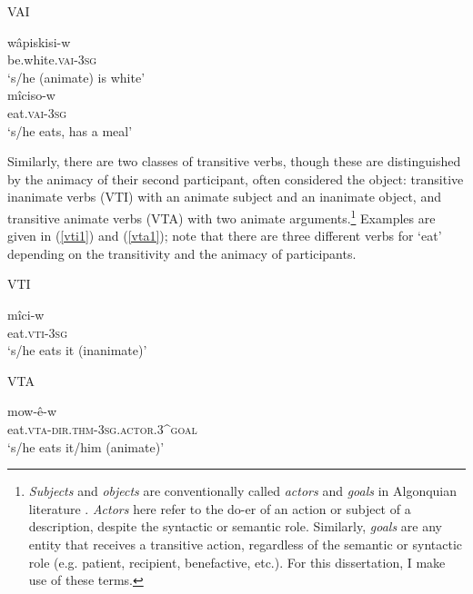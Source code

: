\begin{exe}
\ex VAI
\begin{xlist}
\ex
\gll wâpiskisi-w \\
be.white.\textsc{vai}-3\textsc{sg} \\
\trans `s/he (animate) is white' \\
\ex
\gll m\^{i}ciso-w \\
eat.\textsc{vai}-3\textsc{sg} \\
\trans `s/he eats, has a meal' \\
\end{xlist}
\label{vai1}
\end{exe}

Similarly, there are two classes of transitive verbs, though these are distinguished by the animacy of their second participant, often considered the object: transitive inanimate verbs (VTI) with an animate subject and an inanimate object, and transitive animate verbs (VTA) with two animate arguments.\footnote{\textit{Subjects} and \textit{objects} are conventionally called \textit{actors} and \textit{goals} in Algonquian literature \citep{Bloomfield1946, Wolvengrey2011}. \textit{Actors} here refer to the do-er of an action or subject of a description, despite the syntactic or semantic role. Similarly, \textit{goals} are any entity that receives a transitive action, regardless of the semantic or syntactic role (e.g. patient, recipient, benefactive, etc.). For this dissertation, I make use of these terms.} Examples are given in (\ref{vti1}) and (\ref{vta1}); note that there are three different verbs for `eat' depending on the transitivity and the animacy of participants.
\begin{exe}
\ex VTI
\begin{xlist}
\ex
\gll m\^{i}ci-w \\
eat.\textsc{vti}-3\textsc{sg} \\
\trans `s/he eats it (inanimate)' 
\end{xlist}
\label{vti1}
\end{exe}

\begin{exe}
\ex VTA 
\begin{xlist}
\ex
\gll mow-\^{e}-w \\
eat.\textsc{vta}-\textsc{dir.thm}-3\textsc{sg}.\textsc{actor}.3^{\prime}\textsc{goal} \\
\trans `s/he eats it/him (animate)' \\
\end{xlist}
\label{vta1}
\end{exe}





